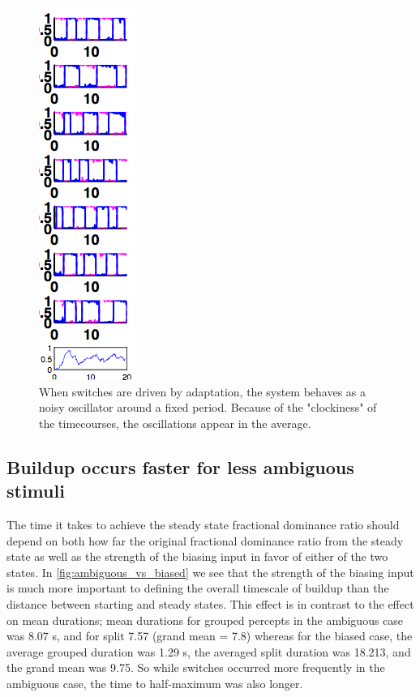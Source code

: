 \documentclass[10pt]{article}
\begin{document}
\begin{figure}[scale = 0.4]
   \begin{center}
   	\includegraphics[scale = 0.5]{../clocky_switches} %
   \caption{When switches are driven by adaptation, the system behaves as a noisy oscillator around a fixed period. Because of the "clockiness" of the timecourses, the oscillations appear in the average.}
   	\label{fig:example}
   \end{center}
\end{figure}




\subsection*{Buildup occurs faster for less ambiguous stimuli}

The time it takes to achieve the steady state fractional dominance ratio should depend on both how far the original fractional dominance ratio from the steady state as well as the strength of the biasing input in favor of either of the two states. In \ref{fig:ambiguous_vs_biased} we see that the strength of the biasing input is much more important to defining the overall timescale of buildup than the distance between starting and steady states. This effect is in contrast to the effect on mean durations; mean durations for grouped percepts in the ambiguous case was 8.07 s, and for split 7.57 (grand mean =  7.8) whereas for the biased case, the average grouped duration was 1.29 s, the averaged split duration was 18.213, and the grand mean was 9.75. So while switches occurred more frequently in the ambiguous case, the time to half-maximum was also longer.
\end{document}
